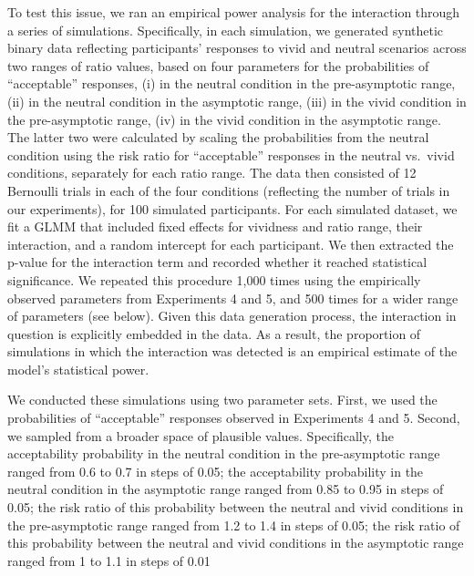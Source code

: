\documentclass[
]{article}
\begin{document}
To test this issue, we ran an empirical power analysis for the interaction through a series of simulations. Specifically, in each simulation, we generated synthetic binary data reflecting participants' responses to vivid and neutral scenarios across two ranges of ratio values, based on four parameters for the probabilities of ``acceptable'' responses, (i) in the neutral condition in the pre-asymptotic range, (ii) in the neutral condition in the asymptotic range, (iii) in the vivid condition in the pre-asymptotic range, (iv) in the vivid condition in the asymptotic range. The latter two were calculated by scaling the probabilities from the neutral condition using the risk ratio for ``acceptable'' responses in the neutral vs.~vivid conditions, separately for each ratio range. The data then consisted of 12 Bernoulli trials in each of the four conditions (reflecting the number of trials in our experiments), for 100 simulated participants. For each simulated dataset, we fit a GLMM that included fixed effects for vividness and ratio range, their interaction, and a random intercept for each participant. We then extracted the p-value for the interaction term and recorded whether it reached statistical significance. We repeated this procedure 1,000 times using the empirically observed parameters from Experiments 4 and 5, and 500 times for a wider range of parameters (see below). Given this data generation process, the interaction in question is explicitly embedded in the data. As a result, the proportion of simulations in which the interaction was detected is an empirical estimate of the model's statistical power.

We conducted these simulations using two parameter sets. First, we used the probabilities of ``acceptable'' responses observed in Experiments 4 and 5. Second, we sampled from a broader space of plausible values. Specifically, the acceptability probability in the neutral condition in the pre-asymptotic range ranged from 0.6 to 0.7 in steps of 0.05; the acceptability probability in the neutral condition in the asymptotic range ranged from 0.85 to 0.95 in steps of 0.05; the risk ratio of this probability between the neutral and vivid conditions in the pre-asymptotic range ranged from 1.2 to 1.4 in steps of 0.05; the risk ratio of this probability between the neutral and vivid conditions in the asymptotic range ranged from 1 to 1.1 in steps of 0.01
\end{document}
